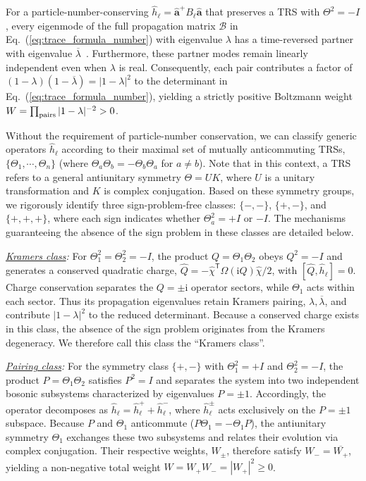 \documentclass[twocolumn,aps,prl,amsmath,amssymb,superscriptaddress,longbibliography]{revtex4-2}
\def\Eq#1{Eq.~(\ref{#1})}
\newcommand{\ii}{\mathrm{i}}
\newcommand{\trans}{\mathsf{T}}
\newcommand{\mc}[1]{\mathcal{#1}}
\newcommand{\bb}[1]{\bm{#1}}
\begin{document}
For a particle-number-conserving $\hat h_\ell = \hat{\bb a}^+B_\ell\hat{\bb a}$ that preserves a TRS with $\Theta^2=-I$, every eigenmode of the full propagation matrix $\mc B$  in \Eq{eq:trace_formula_number} with eigenvalue $\lambda$ has a time-reversed partner with eigenvalue $\overline\lambda$~\cite{wu2005prb}. Furthermore, these partner modes remain linearly independent even when $\lambda$ is real. Consequently, each pair contributes a factor of $(1-\lambda)(1-\overline\lambda)=|1-\lambda|^2$ to the determinant in \Eq{eq:trace_formula_number}, yielding a strictly positive Boltzmann weight $W=\prod_{\rm pairs}|1-\lambda|^{-2}>0$.

Without the requirement of particle-number conservation, we can classify generic operators $\hat{h}_\ell$ according to their maximal set of mutually anticommuting TRSs, $\{\Theta_1,\cdots,\Theta_n\}$ (where $\Theta_a\Theta_b=-\Theta_b\Theta_a$ for $a\ne b$). Note that in this context, a TRS refers to a general antiunitary symmetry $\Theta = UK$, where $U$ is a unitary transformation and $K$ is complex conjugation. Based on these symmetry groups, we rigorously identify three sign-problem-free classes: $\{-,-\}$, $\{+,-\}$, and $\{+,+,+\}$, where each sign indicates whether $\Theta_a^2=+I$ or $-I$. The mechanisms guaranteeing the absence of the sign problem in these classes are detailed below.

\emph{\underline{Kramers class}:} For $\Theta_1^2=\Theta_2^2=-I$, the product $Q=\Theta_1\Theta_2$ obeys $Q^2=-I$ and generates a conserved quadratic charge, $\hat Q=-\hat\chi^\trans\Omega(\ii Q)\hat\chi/2$, with $[\hat Q,\hat h_\ell]=0$. Charge conservation separates the $Q=\pm\ii$ operator sectors, while $\Theta_1$ acts within each sector. Thus its propagation eigenvalues retain Kramers pairing, $\lambda,\overline\lambda$, and contribute $|1-\lambda|^2$ to the reduced determinant. Because a conserved charge exists in this class, the absence of the sign problem originates from the Kramers degeneracy. We therefore call this class the ``Kramers class''.

\emph{\underline{Pairing class}:} For the symmetry class $\{+,-\}$ with $\Theta_1^2=+I$ and $\Theta_2^2=-I$, the product $P=\Theta_1\Theta_2$ satisfies $P^2=I$ and separates the system into two independent bosonic subsystems characterized by eigenvalues $P=\pm 1$. Accordingly, the operator decomposes as $\hat{h}_\ell = \hat{h}^+_\ell + \hat{h}^-_\ell$, where $\hat{h}^{\pm}_\ell$ acts exclusively on the $P=\pm 1$ subspace. Because $P$ and $\Theta_1$ anticommute ($P\Theta_1=-\Theta_1P$), the antiunitary symmetry $\Theta_1$ exchanges these two subsystems and relates their evolution via complex conjugation. Their respective weights, $W_\pm$, therefore satisfy $W_-=\overline{W_+}$, yielding a non-negative total weight $W=W_+W_-=|W_+|^2\ge0$.
\end{document}

